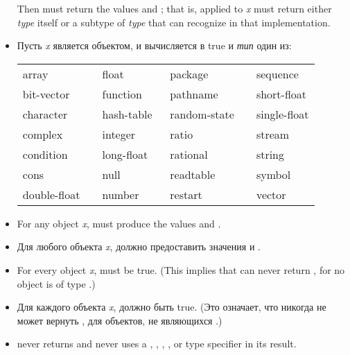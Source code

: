 \begin{defun}[Function]
\begin{new}
\begin{itemize}
Then
must return the values  and ; that is,  applied
to \textit{x} must return either \textit{type} itself or a subtype of \textit{type}
that  can recognize in that implementation.

\item
Пусть \textit{x} является объектом, и 
вычисляется в true и \textit{тип} один из:

\begin{flushleft}
\cf
\begin{tabular}{@{}llll@{}}
array          & float        & package        & sequence \\
bit-vector     & function     & pathname       & short-float \\
character      & hash-table   & random-state~~ & single-float \\
complex        & integer      & ratio          & stream \\
condition      & long-float~~ & rational       & string \\
cons           & null         & readtable      & symbol \\
double-float~~ & number       & restart        & vector
\end{tabular}
\end{flushleft}

\item
For any object \textit{x}, 
must produce the values  and .

\item
Для любого объекта \textit{x}, 
должно предоставить значения  и .

\item
For every object \textit{x}, 
must be true.  (This implies that  can never return ,
for no object is of type .)

\item
Для каждого объекта \textit{x}, 
должно быть true. (Это означает, что  никогда не может вернуть
, для объектов, не являющихся .)

\item
{} never returns  and never uses
a , , , ,
or  type specifier in its result.


\end{itemize}
\end{new}
\end{defun}
